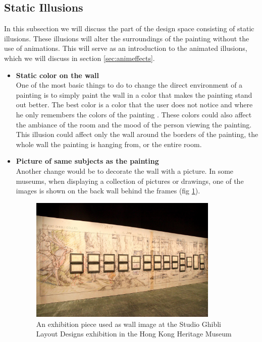 \documentclass[a4paper]{article}
\begin{document}
\subsection{Static Illusions}

In this subsection we will discuss the part of the design space consisting of static illusions. These illusions will alter the surroundings of the painting without the use of animations. This will serve as an introduction to the animated illusions, which we will discuss in section \ref{sec:animeffects}.

\begin{itemize}

\item{\textbf{Static color on the wall}}
\\One of the most basic things to do to change the direct environment of a painting is to simply paint the wall in a color that makes the painting stand out better. The best color is a color that the user does not notice and where he only remembers the colors of the painting \cite{colorwall}. These colors could also affect the ambiance of the room and the mood of the person\cite{mood} viewing the painting. This illusion could affect only the wall around the borders of the painting, the whole wall the painting is hanging from, or the entire room.

\item{\textbf{Picture of same subjects as the painting}} 
\\Another change would be to decorate the wall with a picture. In some museums, when displaying a collection of pictures or drawings, one of the images is shown on the back wall behind the frames (fig \ref{fig:picturewall}).

\begin{figure}[h!]
\label{fig:picturewall}
\centering
\includegraphics[width = 90mm]{PictureWall.jpg}
\caption{An exhibition piece used as wall image at the Studio Ghibli Layout Designs exhibition in the Hong Kong Heritage Museum}
\end{figure}


\end{itemize}
\end{document}
